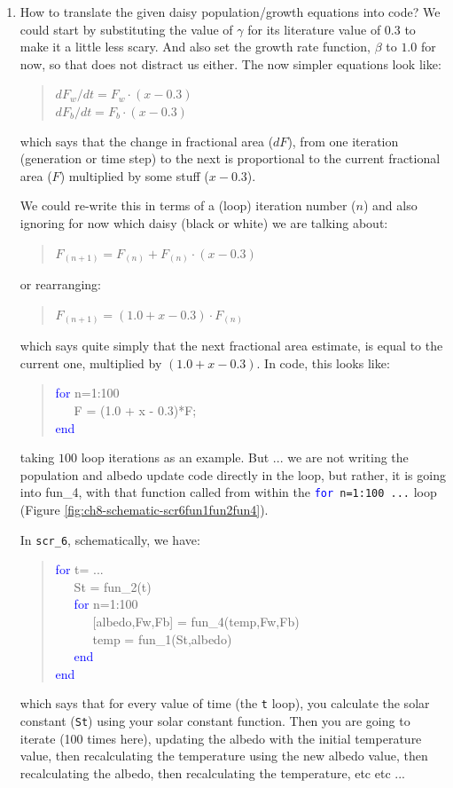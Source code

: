 \documentclass{tufte-book} %
\newenvironment{docspec}{\begin{quotation}\ttfamily\parskip0pt\parindent0pt\ignorespaces}{\end{quotation}}
\begin{document}
\begin{enumerate}
\item How to translate the given daisy population/growth equations into code? We could start by substituting the value of \(\gamma\) for its literature value of \(0.3\) to make it a little less scary. And also set the growth rate function, \(\beta\) to \(1.0\) for now, so that does not distract us either. The now simpler equations look like:
\begin{docspec}
\(dF_{w}/dt = F_{w}\cdot(x-0.3)\)
\\\(dF_{b}/dt = F_{b}\cdot(x-0.3)\)
\end{docspec}
which says that the change in fractional area (\(dF\)), from one iteration (generation or time step) to the next is proportional to the current fractional area (\(F\)) multiplied by some stuff (\(x-0.3\)).

We could re-write this in terms of a (loop) iteration number (\(n\)) and also ignoring for now which daisy (black or white) we are talking about:
\begin{docspec}
\(F_{(n+1)}=F_{(n)} + F_{(n)}\cdot (x-0.3)\)
\end{docspec}
or rearranging:
\begin{docspec}
\(F_{(n+1)}=(1.0 + x-0.3)\cdot F_{(n)}\)
\end{docspec}
which says quite simply that the next fractional area estimate, is equal to the current one, multiplied by \((1.0 + x-0.3)\). In code, this looks like:
\begin{docspec}
\textcolor{blue}{for} n=1:100\\
\ \ \ F = (1.0 + x - 0.3)*F;\\
\textcolor{blue}{end}
\end{docspec}
taking \(100\) loop iterations as an example. But ... we are not writing the population  and albedo update code directly in the loop, but rather, it is going into \textsf{fun\_4}, with that function called from within the \texttt{\textcolor{blue}{for} n=1:100 ...} loop (Figure \ref{fig:ch8-schematic-scr6fun1fun2fun4}).

In \texttt{scr\_6}, schematically, we have:
\begin{docspec}
\textcolor{blue}{for} t= ...\\
\ \ \ St = fun\_2(t)\\
\ \ \ \textcolor{blue}{for} n=1:100\\
\ \ \ \ \ \ [albedo,Fw,Fb] = fun\_4(temp,Fw,Fb)\\
\ \ \ \ \ \ temp = fun\_1(St,albedo)\\
\ \ \ \textcolor{blue}{end}\\
\textcolor{blue}{end}
\end{docspec}
which says that for every value of time (the \texttt{t} loop), you calculate the solar constant (\texttt{St}) using your solar constant function. Then you are going to iterate (100 times here), updating the albedo with the initial temperature value, then recalculating the temperature using the new albedo value, then recalculating the albedo, then recalculating the temperature, etc etc ...


\end{enumerate}
\end{document}
